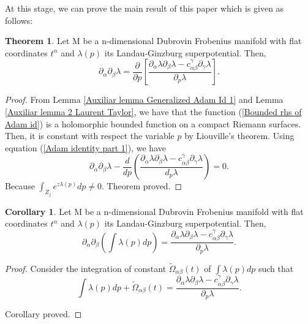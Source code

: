 \documentclass{article}
\theoremstyle{definition}
\newtheorem{theorem}{Theorem}[section]
\newtheorem{corollary}{Corollary}[theorem]
\begin{document}
At this stage, we can prove the main result of this paper which is given as follows:



\begin{theorem}\label{main theorem}
 Let M be a n-dimensional Dubrovin Frobenius manifold with flat coordinates $t^{\alpha}$  and $\lambda(p)$ its Landau-Ginzburg superpotential. Then,
 \begin{equation}\label{second derivative of Hodge variation main theorem}
\partial_{\alpha}\partial_{\beta}\lambda=\frac{\partial}{\partial p}\left[ \frac{ \partial_{\alpha}\lambda \partial_{\beta}\lambda-c_{\alpha\beta}^{\gamma}\partial_{\gamma}\lambda}{ \partial_{p}\lambda}  \right].
\end{equation}
\end{theorem}


\begin{proof}

From Lemma \ref{Auxiliar lemma Generalized Adam Id 1} and Lemma \ref{Auxiliar lemma 2 Laurent Taylor}, we have that the function (\ref{Bounded rhs of Adam id}) is a holomorphic bounded function on a compact Riemann surfaces. Then, it is constant with respect the variable $p$ by Liouville's theorem. Using equation (\ref{Adam identity part 1}), we have 
\begin{equation}
\partial_{\alpha}\partial_{\beta}\lambda - \frac{d}{dp}\left(\frac{\partial_{\alpha}\lambda\partial_{\beta}\lambda-c_{\alpha\beta}^{\gamma}\partial_{\gamma}\lambda}{d_p\lambda}\right)=0.
\end{equation}
Because $\int_{Z_j}e^{z\lambda(p)}dp\neq 0$. Theorem proved.

\end{proof}



\begin{corollary}\label{main corollary}
 Let M be a n-dimensional Dubrovin Frobenius manifold with flat coordinates $t^{\alpha}$  and $\lambda(p)$ its Landau-Ginzburg superpotential. Then,
 \begin{equation}\label{second derivative of Hodge variation corrolary}
\partial_{\alpha}\partial_{\beta}\left(\int\lambda(p)dp\right)= \frac{ \partial_{\alpha}\lambda \partial_{\beta}\lambda-c_{\alpha\beta}^{\gamma}\partial_{\gamma}\lambda}{ \partial_{p}\lambda} .
\end{equation}
\end{corollary}

\begin{proof}
Consider the integration of constant $\tilde\Omega_{\alpha\beta}(t)$ of $\int \lambda(p) dp$ such that
\begin{equation*}
\int \lambda(p) dp+ \tilde\Omega_{\alpha\beta}(t)= \frac{ \partial_{\alpha}\lambda \partial_{\beta}\lambda-c_{\alpha\beta}^{\gamma}\partial_{\gamma}\lambda}{ \partial_{p}\lambda}.
\end{equation*}

Corollary proved.


\end{proof}
\end{document}
